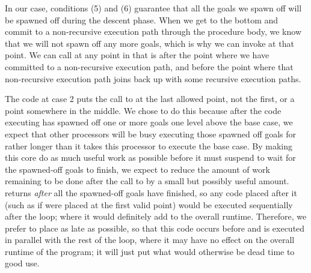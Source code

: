 In our case, conditions (5) and (6) guarantee
that all the goals we spawn off
will be spawned off during the descent phase.
When we get to the bottom and
commit to a non-recursive execution path through the procedure body,
we know that we will not spawn off any more goals,
which is why we can invoke \lcfinish at that point.
We can call \lcfinish at any point in 
that is after the point
where we have committed to a non-recursive execution path,
and before the point where
that non-recursive execution path
joins back up with some recursive execution paths.

The code at case 2 puts the call to \lcfinish
at the last allowed point, not the first, or a point somewhere in the middle.
We chose to do this because after the code executing 
has spawned off one or more goals one level above the base case,
we expect that other processors will be busy executing those spawned off goals
for rather longer than it takes this processor to execute the base case.
By making this core do as much useful work as possible
before it must suspend to wait for the spawned-off goals to finish,
we expect to reduce the amount of work remaining to be done
after the call to \lcfinish by a small but possibly useful amount.
\lcfinish returns \emph{after} all the spawned-off goals have finished,
so any code placed after it
(such as if \lcfinish were placed at the first valid point)
would be executed sequentially after the loop;
where it would definitely add to the overall runtime.
Therefore, we prefer to place \lcfinish as late as possible,
so that this code occurs before \lcfinish
and is executed in parallel with the rest of the loop,
where it may have no effect on the overall runtime of the program;
it will just put what would otherwise be dead time to good use.

